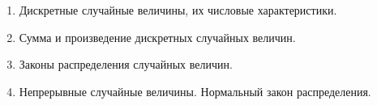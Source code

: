\documentclass[a4paper,12pt]{extarticle}
\begin{document}
\begin{enumerate}
    \item 
        Дискретные случайные величины, их числовые характеристики.
    \item 
        Сумма и произведение дискретных случайных величин.
    \item 
        Законы распределения случайных величин.    
    \item 
        Непрерывные случайные величины. Нормальный закон распределения.

\end{enumerate}
\end{document}
